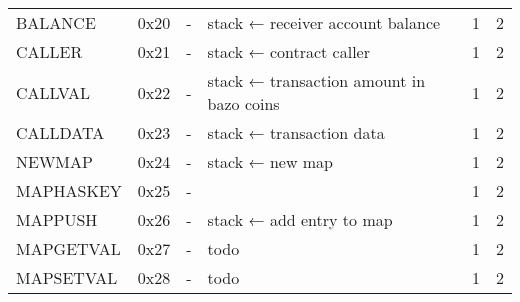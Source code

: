\begin{longtable}[c]{L{2.5cm} L{1cm} L{3cm} L{5.5cm} R{0.8cm} R{1cm} }
BALANCE   & 0x20   & -                                                                                                        & stack ← receiver account balance                                                                            & 1         & 2          \\
CALLER    & 0x21   & -                                                                                                        & stack ← contract caller                                                                                     & 1         & 2          \\
CALLVAL   & 0x22   & -                                                                                                        & stack ← transaction amount in bazo coins                                                                    & 1         & 2          \\
CALLDATA  & 0x23   & -                                                                                                        & stack ← transaction data                                                                                    & 1         & 2          \\
NEWMAP    & 0x24   & -                                                                                                        & stack ← new map                                                                                             & 1         & 2          \\
MAPHASKEY  & 0x25   & -                                                                                                        &                                                                                                             & 1         & 2          \\
MAPPUSH   & 0x26   & -                                                                                                        & stack ← add entry to map                                                                                    & 1         & 2          \\
MAPGETVAL & 0x27   & -                                                                                                        & todo                                                                                                        & 1         & 2          \\
MAPSETVAL & 0x28   & -                                                                                                        & todo                                                                                                        & 1         & 2          \\

\end{longtable}
